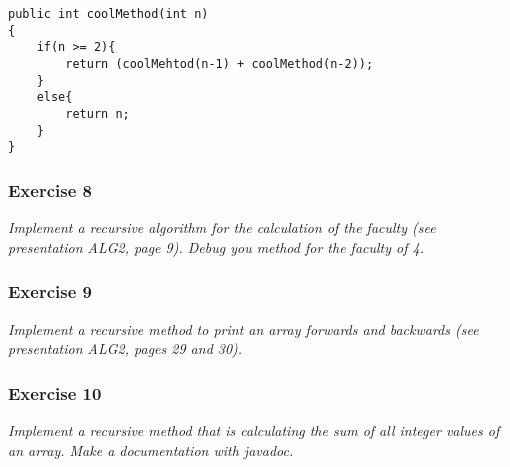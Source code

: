 \begin{lstlisting}
public int coolMethod(int n)
{
	if(n >= 2){
		return (coolMehtod(n-1) + coolMethod(n-2));
	} 
	else{
		return n;
	}
}
\end{lstlisting}

\subsubsection*{Exercise 8}
\textit{Implement a recursive algorithm for the calculation of the
faculty (see presentation ALG2, page 9). Debug you method for the
faculty of 4.} \\

\subsubsection*{Exercise 9}
\textit{Implement a recursive method to print an array forwards and
 backwards (see presentation ALG2, pages 29 and 30).} \\

\subsubsection*{Exercise 10}
\textit{Implement a recursive method that is calculating the sum of
all integer values of an array. Make a documentation with javadoc.} \\

